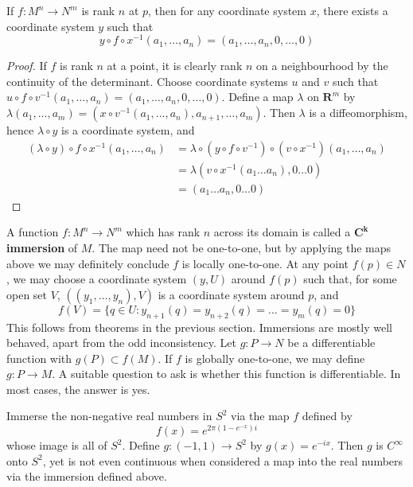 \begin{corollary}
    If $f: M^n \to N^m$ is rank $n$ at $p$, then for any coordinate system $x$, there exists a coordinate system $y$ such that
    \[ y \circ f \circ x^{-1} (a_1, \dots, a_n) = (a_1, \dots, a_n, 0, \dots, 0) \]
\end{corollary}
\begin{proof}
    If $f$ is rank $n$ at a point, it is clearly rank $n$ on a neighbourhood by the continuity of the determinant. Choose coordinate systems $u$ and $v$ such that $u \circ f \circ v^{-1}(a_1, \dots, a_n) = (a_1, \dots, a_n, 0, \dots, 0)$. Define a map $\lambda$ on $\mathbf{R}^m$ by $\lambda(a_1, \dots, a_m) = (x \circ v^{-1}(a_1, \dots, a_n), a_{n+1}, \dots, a_m)$. Then $\lambda$ is a diffeomorphism, hence $\lambda \circ y$ is a coordinate system, and
    \begin{align*}
        (\lambda \circ y) \circ f \circ x^{-1} (a_1, \dots, a_n) &= \lambda \circ (y \circ f \circ v^{-1}) \circ (v \circ x^{-1}) (a_1, \dots, a_n)\\
        &= \lambda (v \circ x^{-1} (a_1 \dots a_n), 0 \dots 0)\\
        &= (a_1 \dots a_n, 0 \dots 0)
    \end{align*}
\end{proof}

A function $f:M^n \to N^m$ which has rank $n$ across its domain is called a {\bf $\mathbf{C^k}$ immersion} of $M$. The map need not be one-to-one, but by applying the maps above we may definitely conclude $f$ is locally one-to-one. At any point $f(p) \in N$, we may choose a coordinate system $(y,U)$ around $f(p)$ such that, for some open set $V$, $((y_1, \dots, y_n),V)$ is a coordinate system around $p$, and
%
\[ f(V) = \{ q \in U : y_{n+1}(q) = y_{n+2}(q) = \dots = y_m(q) = 0 \} \]
%
This follows from theorems in the previous section. Immersions are mostly well behaved, apart from the odd inconsistency. Let $g:P \to N$ be a differentiable function with $g(P) \subset f(M)$. If $f$ is globally one-to-one, we may define $g:P \to M$. A suitable question to ask is whether this function is differentiable. In most cases, the answer is yes.

\begin{example}
    Immerse the non-negative real numbers in $S^2$ via the map $f$ defined by
    \[ f(x) = e^{2\pi(1 - e^{-x})i} \]
    whose image is all of $S^2$. Define $g:(-1,1) \to S^2$ by $g(x) = e^{-ix}$. Then $g$ is $C^\infty$ onto $S^2$, yet is not even continuous when considered a map into the real numbers via the immersion defined above.
\end{example}

